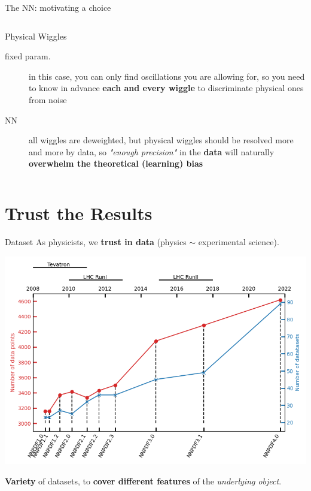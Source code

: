 \documentclass[9pt]{beamer}
\begin{document}
\begin{frame}{The NN: motivating a choice}
\begin{columns}
\begin{column}{0.5\textwidth}
\begin{exampleblock}{Physical Wiggles}
                \begin{description}
                    \item[fixed param.] in this case, you can only find
                        oscillations you are allowing for, so you need to know
                        in advance \textbf{each and every wiggle} to
                        discriminate physical ones from noise
                    \item[NN] all wiggles are deweighted, but physical wiggles
                        should be resolved more and more by data, so
                        \textit{"enough precision"} in the
                        \alert{\textbf{data}} will naturally
                        \textbf{\alert{overwhelm} the theoretical
                        \alert{(learning) bias}}
                \end{description}
            \end{exampleblock}
        \end{column}
    \end{columns}
\end{frame}

\section{Trust the Results}

\begin{frame}{Dataset}
    \vspace*{5pt}
    As physicists, we \alert{\textbf{trust in data}} (physics $\sim$
    experimental science).
    \begin{center}
        \begin{tcolorbox}[width=0.65\textwidth]
            \includegraphics[width=\textwidth]{data}
        \end{tcolorbox}
    \end{center}
    \textbf{Variety} of datasets, to \textbf{cover different features} of the
    \textit{underlying object}.
\end{frame}
\end{document}
